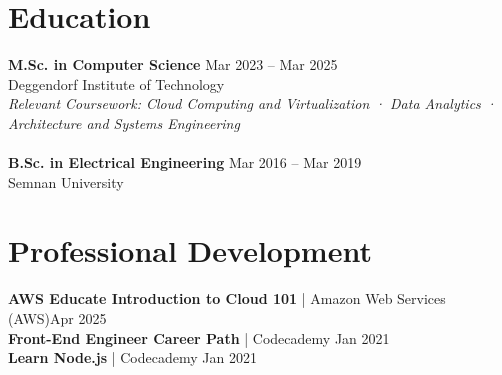 \documentclass[a4paper,10pt]{article}
\begin{document}
\section*{Education}
\vspace{-0.8em}
\hline
\vspace{0.2em}

\textbf{M.Sc. in Computer Science} \hfill Mar 2023 -- Mar 2025 \\
Deggendorf Institute of Technology\\
\textit{Relevant Coursework: Cloud Computing and Virtualization · Data Analytics · Architecture and Systems Engineering}\\
\\
\textbf{B.Sc. in Electrical Engineering} \hfill Mar 2016 -- Mar 2019 \\
Semnan University\\
\vspace{-2em}

\section*{Professional Development}
\vspace{-0.8em}
\hline
\vspace{0.2em}
\textbf{AWS Educate Introduction to Cloud 101} | Amazon Web Services (AWS)\hfill Apr 2025\\
\textbf{Front-End Engineer Career Path} | Codecademy \hfill Jan 2021\\
\textbf{Learn Node.js} | Codecademy \hfill Jan 2021\\
\end{document}
